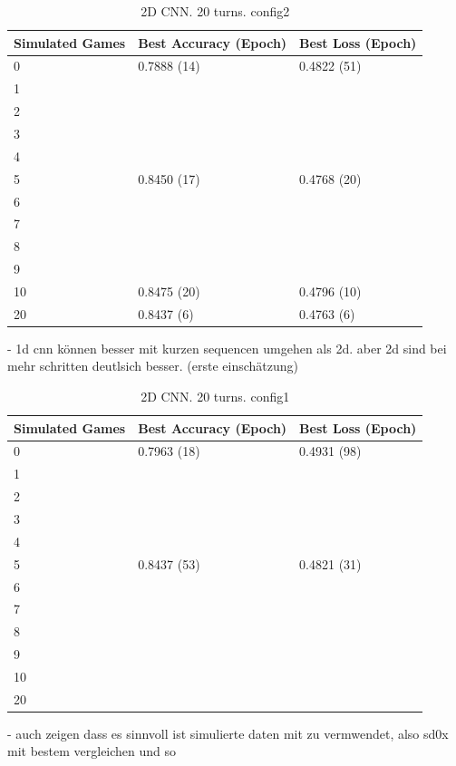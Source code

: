 \begin{table}[H]
	\centering
	\caption{2D CNN. 20 turns. config2}%
	\begin{tabular}{|l|l|l|}
		\hline
		Simulated Games & Best Accuracy (Epoch) & Best Loss (Epoch)\\
		\hline
		0 & 0.7888 (14) & 0.4822 (51) \\
		1 &  &  \\
		2 &  &  \\
		3 &  &  \\
		4 &  &  \\
		5 & 0.8450 (17) & 0.4768 (20) \\
		6 &  &  \\
		7 &  &  \\
		8 &  &  \\
		9 &  &  \\
		10 & 0.8475 (20) & 0.4796 (10) \\
		20 & 0.8437 (6) & 0.4763 (6) \\
		\hline
	\end{tabular}
\end{table}

- 1d cnn können besser mit kurzen sequencen umgehen als 2d. aber 2d sind bei mehr schritten deutlsich besser. (erste einschätzung) 

\begin{table}[H]
	\centering
	\caption{2D CNN. 20 turns. config1}%
	\begin{tabular}{|l|l|l|}
		\hline
		Simulated Games & Best Accuracy (Epoch) & Best Loss (Epoch)\\
		\hline
		0 & 0.7963 (18) & 0.4931 (98) \\
		1 &  &  \\
		2 &  &  \\
		3 &  &  \\
		4 &  &  \\
		5 & 0.8437 (53) & 0.4821 (31) \\
		6 &  &  \\
		7 &  &  \\
		8 &  &  \\
		9 &  &  \\
		10 &  &  \\
		20 &  &  \\
		\hline
	\end{tabular}
\end{table}



- auch zeigen dass es sinnvoll ist simulierte daten mit zu vermwendet, also sd0x mit bestem vergleichen und so\\

